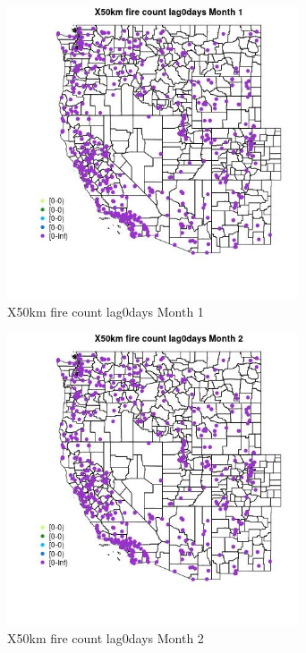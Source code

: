 \begin{figure} 
\centering  
\includegraphics[width=0.77\textwidth]{Code_Outputs/Report_ML_input_PM25_Step4_part_e_de_duplicated_aves_compiled_2019-05-14wNAs_MapObsMo1X50km_fire_count_lag0days.jpg} 
\caption{\label{fig:Report_ML_input_PM25_Step4_part_e_de_duplicated_aves_compiled_2019-05-14wNAsMapObsMo1X50km_fire_count_lag0days}X50km fire count lag0days Month 1} 
\end{figure} 
 

\begin{figure} 
\centering  
\includegraphics[width=0.77\textwidth]{Code_Outputs/Report_ML_input_PM25_Step4_part_e_de_duplicated_aves_compiled_2019-05-14wNAs_MapObsMo2X50km_fire_count_lag0days.jpg} 
\caption{\label{fig:Report_ML_input_PM25_Step4_part_e_de_duplicated_aves_compiled_2019-05-14wNAsMapObsMo2X50km_fire_count_lag0days}X50km fire count lag0days Month 2} 
\end{figure} 
 

